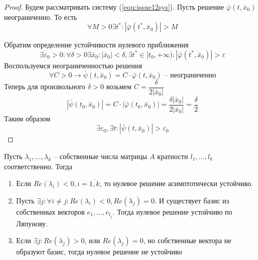 \begin{proof}
	Будем рассматривать систему (\ref{equ:issue12sys}). Пусть решение $\bar{\varphi}(t, \bar{x}_0)$ неограниченно. То есть 
	\[
		\forall M>0 \exists t^*:|\bar{\varphi}(t^*, \bar{x}_0)|>M
	\]
	
	Обратим определение устойчивости нулевого приближения 
	\[
		\exists \varepsilon_0>0: \forall \delta>0 \exists \bar{x}_0: |\bar{x}_0|<\delta, \exists t^*\in[t_0, +\infty): |\bar{\varphi}(t^*, \bar{x}_0)|>\varepsilon
	\]
	Воспользуемся неограниченностью решения
	\[
		\forall C>0 \to \bar{\psi}(t, \bar{x}_0) = C\cdot\bar{\varphi}(t, \bar{x}_0) \text{ -- неограниченно} 
	\]
	Теперь для произвольного $\delta >0 $ возьмем $C = \dfrac{\delta}{2|\bar{x}_0|}$
	\[
		|\bar{\psi}(t_0, \bar{x}_0)| = C\cdot|\bar{\varphi}(t_0, \bar{x}_0)| = \frac{\delta |\bar{x}_0|}{2|\bar{x}_0|} = \frac{\delta}{2}
	\]
	Таким образом
	\[
		\exists \varepsilon_0, \exists t: 	|\bar{\psi}(t, \bar{x}_0)| > \varepsilon_0
	\]
\end{proof}

\begin{theorem}
	Пусть $\lambda_1, \dots, \lambda_k$ -- собственные числа матрицы $A$ кратности $l_1, \dots, l_k$ соответственно. Тогда
	\begin{enumerate}
		\item Если $Re(\lambda_i)<0, i=\overline{1, k}$, то нулевое решение асимптотически устойчиво.
		\item Пусть $\exists j: \forall i\neq j :Re(\lambda_i) < 0, Re(\lambda_j) = 0$. И существует базис из собственных векторов $e_{1}, \dots, e_{l_j}$. Тогда нулевое решение устойчиво по Ляпунову.
		\item Если $\exists j: Re(\lambda_j) > 0$, или $Re(\lambda_j) = 0$, но собственные вектора не образуют базис, тогда нулевое решение не устойчиво
	\end{enumerate}
\end{theorem}

